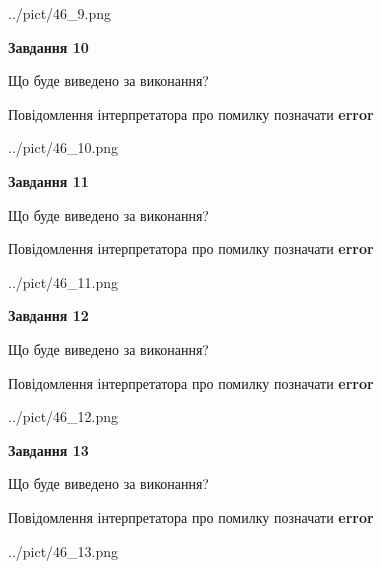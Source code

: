 \documentclass[11pt, ukrainian]{article}
\begin{document}
{\begin {large}
\begin{center}
	{../pict/46_9.png}
\end{center}
\newpage

{\begin {center}\textbf{Завдання 10}\end {center}}\par
Що буде виведено за виконання? \par
Повідомлення інтерпретатора про помилку позначати \textbf{error}

\begin{center}
	{../pict/46_10.png}
\end{center}
\newpage

{\begin {center}\textbf{Завдання 11}\end {center}}\par
Що буде виведено за виконання? \par
Повідомлення інтерпретатора про помилку позначати \textbf{error}

\begin{center}
	{../pict/46_11.png}
\end{center}
\newpage

{\begin {center}\textbf{Завдання 12}\end {center}}\par
Що буде виведено за виконання? \par
Повідомлення інтерпретатора про помилку позначати \textbf{error}

\begin{center}
	{../pict/46_12.png}
\end{center}
\newpage

{\begin {center}\textbf{Завдання 13}\end {center}}\par
Що буде виведено за виконання? \par
Повідомлення інтерпретатора про помилку позначати \textbf{error}

\begin{center}
	{../pict/46_13.png}
\end{center}
\newpage


\end{large}}
\end{document}
